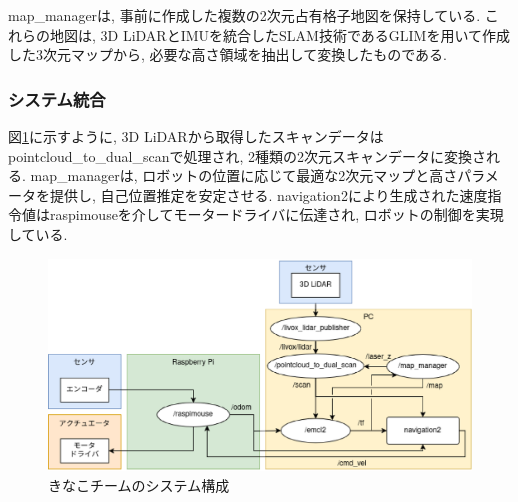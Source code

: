 map\_managerは, 事前に作成した複数の2次元占有格子地図を保持している. 
これらの地図は, 3D LiDARとIMUを統合したSLAM技術であるGLIMを用いて作成した3次元マップから, 必要な高さ領域を抽出して変換したものである. 

\subsubsection{システム統合}
図\ref{fig:kinako_system}に示すように, 3D LiDARから取得したスキャンデータはpointcloud\_to\_dual\_scanで処理され, 2種類の2次元スキャンデータに変換される. 
map\_managerは, ロボットの位置に応じて最適な2次元マップと高さパラメータを提供し, 自己位置推定を安定させる. 
navigation2により生成された速度指令値はraspimouseを介してモータードライバに伝達され, ロボットの制御を実現している. 

\begin{figure}[h]
  \begin{center}
    \includegraphics[width=1.0\linewidth]{figs/kinako_system.eps}
    \caption{きなこチームのシステム構成}
    \label{fig:kinako_system}
  \end{center}
\end{figure}
